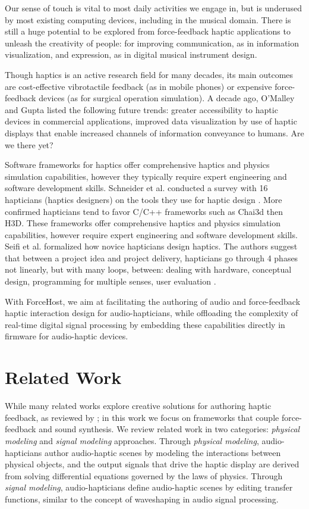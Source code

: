 \documentclass[sigconf]{nimeart}
\begin{document}
Our sense of touch is vital to most daily activities we engage in, but is underused by most existing computing devices, including in the musical domain. There is still a huge potential to be explored from force-feedback haptic applications to unleash the creativity of people: for improving communication, as in information visualization, and expression, as in digital musical instrument design.

Though haptics is an active research field for many decades, its main outcomes are cost-effective vibrotactile feedback (as in mobile phones) or expensive force-feedback devices (as for surgical operation simulation). A decade ago, O'Malley and Gupta \cite{OU2019Malley2008Haptic} listed the following future trends: greater accessibility to haptic devices in commercial applications, improved data visualization by use of haptic displays that enable increased channels of information conveyance to humans. Are we there yet?

Software frameworks for haptics offer comprehensive haptics and physics simulation capabilities, however they typically require expert engineering and software development skills. Schneider et al. conducted a survey with 16 hapticians (haptics designers) on the tools they use for haptic design \cite{Schneider2017Haptic}. More confirmed hapticians tend to favor C/C++ frameworks such as Chai3d \cite{Conti2003CHAI} then H3D. These frameworks offer comprehensive haptics and physics simulation capabilities, however require expert engineering and software development skills. Seifi et al. formalized how novice hapticians design haptics. The authors suggest that between a project idea and project delivery, hapticians go through 4 phases not linearly, but with many loops, between: dealing with hardware, conceptual design, programming for multiple senses, user evaluation \cite{Seifi2020How}.

With ForceHost, we aim at facilitating the authoring of audio and force-feedback haptic interaction design for audio-hapticians, while offloading the complexity of real-time digital signal processing by embedding these capabilities directly in firmware for audio-haptic devices.

\section{Related Work}\label{related-work}

While many related works explore creative solutions for authoring haptic feedback, as reviewed by \cite{Schneider2017Haptic,Covaci2018Is,Seifi2020How}; in this work we focus on frameworks that couple force-feedback and sound synthesis. We review related work in two categories: \emph{physical modeling} and \emph{signal modeling} approaches. Through \emph{physical modeling}, audio-hapticians author audio-haptic scenes by modeling the interactions between physical objects, and the output signals that drive the haptic display are derived from solving differential equations governed by the laws of physics. Through \emph{signal modeling}, audio-hapticians define audio-haptic scenes by editing transfer functions, similar to the concept of waveshaping in audio signal processing.
\end{document}
